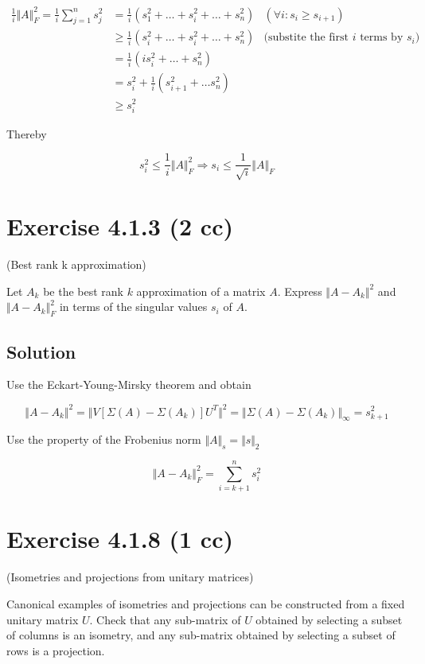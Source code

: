 \documentclass{article}
\begin{document}
\begin{equation*}
    \begin{aligned}
        \frac{1}{i} \Vert A \Vert_F^2 = \frac{1}{i}\sum_{j=1}^n s_j^2 & = \frac{1}{i}(s_1^2 + \dots + s_i^2 + \dots + s_n^2) & (\forall i: s_i \geq s_{i+1})\\
        & \geq \frac{1}{i}(s_i^2 + \dots + s_i^2 + \dots + s_n^2) &\text{(substite the first $i$ terms by $s_i$)}\\
        & = \frac{1}{i}(is_i^2 + \dots + s_n^2) \\
        & = s_i^2 + \frac{1}{i}(s_{i+1}^2 + \dots s_n^2) \\
        & \geq s_i^2
    \end{aligned}
\end{equation*}

Thereby

$$s_i^2 \leq \frac{1}{i} \Vert A \Vert_F^2 \Rightarrow s_i \leq \frac{1}{\sqrt{i}} \Vert A \Vert_F$$

\section{Exercise 4.1.3 (2 cc)}

(Best rank k approximation)

Let $A_k$ be the best rank $k$ approximation of a matrix $A$. Express $\Vert A - A_k\Vert^2$ and $\Vert A - A_k \Vert^2_F$ in terms of the singular values $s_i$ of $A$.

\subsection{Solution}

Use the Eckart-Young-Mirsky theorem and obtain

$$\Vert A - A_k \Vert^2 = \Vert V [\Sigma(A) - \Sigma(A_k)] U^T \Vert^2 = \Vert \Sigma(A) - \Sigma(A_k) \Vert_\infty = s_{k+1}^2$$

Use the property of the Frobenius norm $\Vert A \Vert_s = \Vert s \Vert_2$

$$\Vert A - A_k \Vert^2_F = \sum_{i=k+1}^ns_i^2$$

\section{Exercise 4.1.8 (1 cc)}

(Isometries and projections from unitary matrices)

Canonical examples of isometries and projections can be constructed from a fixed unitary matrix $U$. Check that any sub-matrix of $U$ obtained by selecting a subset of columns is an isometry, and any sub-matrix obtained by selecting a subset of rows is a projection.
\end{document}
